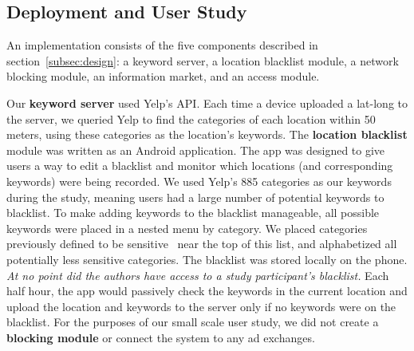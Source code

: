 \subsection{Deployment and User Study}
An implementation consists of the five components described in section~\ref{subsec:design}:
a keyword server, a location blacklist module, a network blocking module, an information market, and an access module.

Our \textbf{keyword server} used Yelp's API.  %
Each time a device uploaded a lat-long to the server, we queried Yelp to find the categories of each location within 50 meters, using these categories as the location's keywords.
The \textbf{location blacklist} module was written as an Android application. 
The app was designed to give users a way to edit a blacklist and monitor which locations (and corresponding keywords) were being recorded. 
We used Yelp's 885 categories as our keywords during the study, meaning users had a large number of potential keywords to blacklist.
To make adding keywords to the blacklist manageable, all possible keywords were placed in a nested menu by category. 
We placed categories previously defined to be sensitive~\cite{bing} near the top of this list, and alphabetized all potentially less sensitive categories.
The blacklist was stored locally on the phone. 
\emph{At no point did the authors have access to a study participant's blacklist.}
Each half hour, the app would passively check the keywords in the current location and upload the location and keywords to the server only if no keywords were on the blacklist.
For the purposes of our small scale user study, we did not create a \textbf{blocking module} or connect the system to any ad exchanges.

